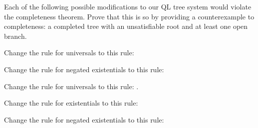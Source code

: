 \problempart
Each of the following possible modifications to our QL tree system would violate the completeness theorem. Prove that this is so by providing a counterexample to completeness: a completed tree with an unsatisfiable root and at least one open branch.

\begin{earg}

\item Change the rule for universals to this rule:

\item Change the rule for negated existentials to this rule:

\item Change the rule for universals to this rule:
.

\item Change the rule for existentials to this rule:

\item Change the rule for negated existentials to this rule:

\end{earg}



